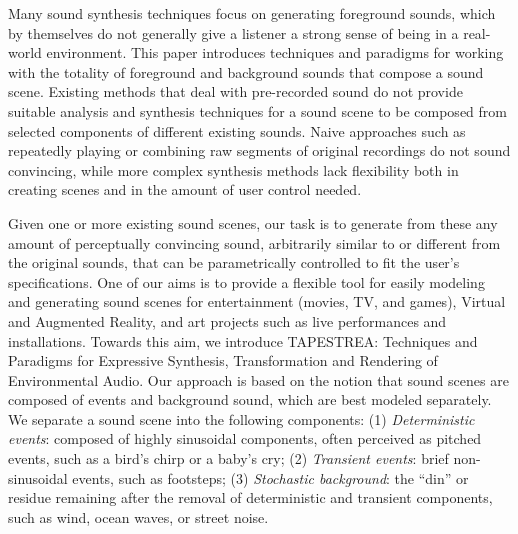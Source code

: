 \documentclass[a4paper]{article}
\begin{document}
Many sound synthesis techniques focus on generating foreground sounds, 
which by themselves do not generally give a listener 
a strong sense of being in a real-world environment. This paper introduces 
techniques and paradigms for working with the totality of foreground and background 
sounds that compose a sound scene.
Existing methods that deal with pre-recorded sound do not 
provide suitable analysis and synthesis techniques for a sound scene to be composed 
from selected components of different existing sounds.
Naive approaches such as repeatedly playing or combining 
raw segments of original recordings do not sound convincing, while more complex 
synthesis methods lack flexibility both in creating scenes and in the 
amount of user control needed.

Given one or more existing sound scenes, our task is to generate from 
these any amount of perceptually convincing sound, arbitrarily similar to 
or different from the original sounds, that can be parametrically controlled to fit the user's 
specifications. One of our aims is to provide a flexible tool for 
easily modeling and generating sound scenes for 
entertainment (movies, TV, and games), Virtual and Augmented Reality, 
and art projects such as live performances and installations.
Towards this aim, we introduce TAPESTREA: Techniques and Paradigms for 
Expressive Synthesis, Transformation and Rendering of Environmental 
Audio. Our approach is based on the notion that sound scenes are 
composed of events and background sound, which are best modeled 
separately. We separate a sound scene into the following 
components:
(1) \emph{Deterministic events}: composed of highly sinusoidal components, 
often perceived as pitched events, such as a bird's chirp or a baby's cry;
(2) \emph{Transient events}: brief non-sinusoidal events, such as footsteps;
(3) \emph{Stochastic background}: the ``din'' or residue remaining after the 
removal of deterministic and transient components, such as wind, ocean waves, or 
street noise.
\end{document}
